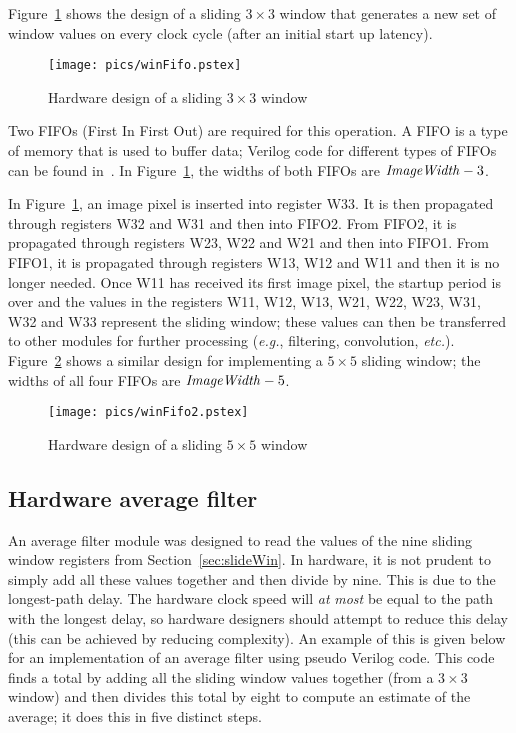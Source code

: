 \documentclass[10pt,twocolumn,letterpaper]{article}
\begin{document}
Figure~\ref{fig:winFifo} shows the design of a sliding $3\times3$ window that generates a new set of window
values on every clock cycle (after an initial start up latency).
\begin{figure}[!htb]
\begin{center}
\setlength{\abovecaptionskip}{-0.25cm}
        \texttt{[image: pics/winFifo.pstex]}
        \caption{Hardware design of a sliding $3\times3$ window}
        \label{fig:winFifo}
\setlength{\abovecaptionskip}{0cm}
\end{center}
\end{figure}
Two FIFOs (First In First Out) are required for this operation.
A FIFO is a type of memory that is used to buffer data;
Verilog code for different types of FIFOs can be found in~\cite{zeidbk}.
In Figure~\ref{fig:winFifo}, the widths of both FIFOs are $\mbox{\emph{ImageWidth}} - 3$.

In Figure~\ref{fig:winFifo}, an image pixel is inserted into register W33. It is then propagated through
registers W32 and W31 and then into FIFO2. From FIFO2, it is propagated through registers W23, W22 and
W21 and then into FIFO1. From FIFO1, it is propagated through registers W13, W12 and W11 and then it is no longer needed.
Once W11 has received its first image pixel, the startup period is over and 
the values in the registers W11, W12, W13, W21, W22, W23, W31, W32 and W33 represent the sliding window; 
these values can then be transferred to other modules for further processing (\emph{e.g.}, filtering, convolution, \emph{etc.}).
Figure~\ref{fig:winFifo2} shows a similar design for implementing a $5\times5$ sliding window; the widths of all four 
FIFOs are $\mbox{\emph{ImageWidth}} - 5$.
\begin{figure}[!htb]
\begin{center}
\setlength{\abovecaptionskip}{-0.25cm}
        \texttt{[image: pics/winFifo2.pstex]}
        \caption{Hardware design of a sliding $5\times5$ window}
        \label{fig:winFifo2}
\setlength{\abovecaptionskip}{0cm}
\end{center}
\end{figure}

\subsection{Hardware average filter}
\label{sec:av}
An average filter module was designed to read the values of the nine sliding window registers from Section~\ref{sec:slideWin}.
In hardware, it is not prudent to simply add all these values together and then divide by nine. This is due to the longest-path delay.
The hardware clock speed will \emph{at} \emph{most} be equal to the path with the longest delay, so hardware designers should
attempt to reduce this delay (this can be achieved by reducing complexity). An example of this is given
below for an implementation of an average filter using pseudo Verilog code. This code finds a total by adding 
all the sliding window values
together (from a $3\times3$ window) and then divides this total by eight to compute an estimate of the average; 
it does this in five distinct steps.
\end{document}
